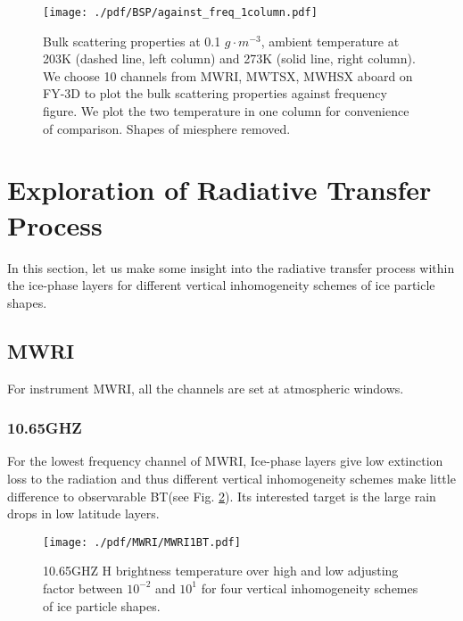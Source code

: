 \documentclass[a4paper]{report}
\begin{document}
\begin{figure}[hbtp] 
\centering
\texttt{[image: ./pdf/BSP/against\_freq\_1column.pdf]}
\caption{Bulk scattering properties at 0.1 $g \cdot m^{-3}$, ambient temperature at 203K (dashed line, left column) and 273K (solid line, right column).
We choose 10 channels from MWRI, MWTSX, MWHSX aboard on FY-3D to plot the bulk scattering properties against frequency figure.
We plot the two temperature in one column for convenience of comparison. Shapes of miesphere removed.}
\label{fig:against_freq_1column}
\end{figure}

\clearpage

\section{Exploration of Radiative Transfer Process}

In this section, let us make some insight into the radiative transfer process within the ice-phase layers for 
different vertical inhomogeneity schemes of ice particle shapes.

\subsection{MWRI}
For instrument MWRI, all the channels are set at atmospheric windows.

\subsubsection{10.65GHZ}
For the lowest frequency channel of MWRI, Ice-phase layers give low extinction loss to the radiation and thus different vertical inhomogeneity
schemes make little difference to observarable BT(see Fig. \ref{fig:MWRI1BT}). Its interested target is the large rain drops in low latitude layers.

\begin{figure}[hbtp] 
\centering
\texttt{[image: ./pdf/MWRI/MWRI1BT.pdf]}
\caption{10.65GHZ H brightness temperature over high and low adjusting factor between $10^{-2}$ and $10^{1}$ for four vertical 
inhomogeneity schemes of ice particle shapes.}
\label{fig:MWRI1BT}
\end{figure}
\end{document}
